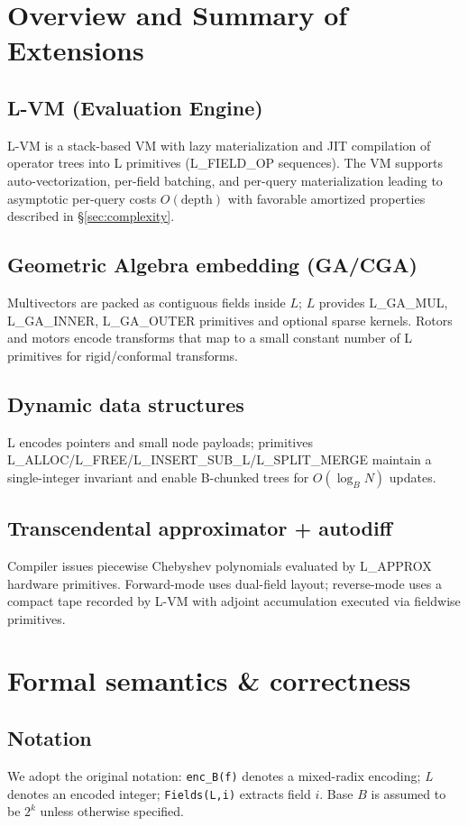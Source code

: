 \documentclass[11pt]{article}
\theoremstyle{definition}
\theoremstyle{plain}
\begin{document}
\section{Overview and Summary of Extensions}
\subsection{L-VM (Evaluation Engine)}
L-VM is a stack-based VM with lazy materialization and JIT compilation of operator trees into L primitives (L\_FIELD\_OP sequences). The VM supports auto-vectorization, per-field batching, and per-query materialization leading to asymptotic per-query costs \(O(\mathrm{depth})\) with favorable amortized properties described in \S\ref{sec:complexity}.

\subsection{Geometric Algebra embedding (GA/CGA)}
Multivectors are packed as contiguous fields inside \(L\); \(L\) provides L\_GA\_MUL, L\_GA\_INNER, L\_GA\_OUTER primitives and optional sparse kernels. Rotors and motors encode transforms that map to a small constant number of L primitives for rigid/conformal transforms.

\subsection{Dynamic data structures}
L encodes pointers and small node payloads; primitives L\_ALLOC/L\_FREE/L\_INSERT\_SUB\_L/L\_SPLIT\_MERGE maintain a single-integer invariant and enable B-chunked trees for \(O(\log_B N)\) updates.

\subsection{Transcendental approximator + autodiff}
Compiler issues piecewise Chebyshev polynomials evaluated by L\_APPROX hardware primitives. Forward-mode uses dual-field layout; reverse-mode uses a compact tape recorded by L-VM with adjoint accumulation executed via fieldwise primitives.

\section{Formal semantics \& correctness}
\subsection{Notation}
We adopt the original notation: \texttt{enc\_B(f)} denotes a mixed-radix encoding; \textit{L} denotes an encoded integer; \texttt{Fields(L,i)} extracts field \(i\). Base \(B\) is assumed to be \(2^k\) unless otherwise specified.
\end{document}
